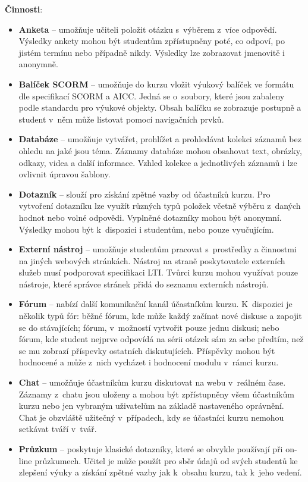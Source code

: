 \documentclass[
print,
  11pt,
  table,   
  nolof,    
  nolot,
  oneside,
  draft
]{fithesis3}
\begin{document}
\textbf{Činnosti}:
\begin{itemize}
\item \textbf{Anketa} -- umožňuje učiteli položit otázku s~výběrem z~více odpovědí. Výsledky ankety mohou být studentům zpřístupněny poté, co odpoví, po jistém termínu nebo případně nikdy. Výsledky lze zobrazovat jmenovitě i anonymně.
\item \textbf{Balíček SCORM} -- umožňuje do kurzu vložit výukový balíček ve formátu dle specifikací SCORM a AICC. Jedná se o~soubory, které jsou zabaleny podle standardu pro výukové objekty. Obsah balíčku se zobrazuje postupně a student v~něm může listovat pomocí navigačních prvků. 
\item \textbf{Databáze} -- umožňuje vytvářet, prohlížet a prohledávat kolekci záznamů bez ohledu na jaké jsou téma. Záznamy databáze mohou obsahovat text, obrázky, odkazy, videa a další informace. Vzhled kolekce a jednotlivých zázna\-mů i lze ovlivnit úpravou šablony.
\item \textbf{Dotazník} -- slouží pro získání zpětné vazby od účastníků kurzu. Pro vytvoření dotazníku lze využít různých typů položek včetně výběru z~daných hodnot nebo volné odpovědi. Vyplněné dotazníky mohou být anonymní. Výsledky mohou být k~dispozici i studentům, nebo pouze vyučujícím.
\item \textbf{Externí nástroj} -- umožňuje studentům pracovat s~prostředky a činnostmi na jiných webových stránkách. Nástroj na straně poskytovatele externích služeb musí podporovat specifikaci LTI. Tvůrci kurzu mohou využívat pouze nástroje, které správce stránek přidá do seznamu externích nástrojů.
\item \textbf{Fórum} -- nabízí další komunikační kanál účastníkům kurzu. K~dispozici je několik typů fór: běžné fórum, kde může každý začínat nové diskuse a zapojit se do stávajících; fórum, v~možností vytvořit pouze jednu diskusi; nebo fórum, kde student nejprve odpovídá na sérii otázek sám za sebe předtím, než se mu zobrazí příspevky ostatních diskutujících. Příspěvky mohou být hodnocené a může z~nich vycházet i hodnocení modulu v~rámci kurzu.
\item \textbf{Chat} -- umožňuje účastníkům kurzu diskutovat na webu v~reálném čase. Záznamy z~chatu jsou uloženy a mohou být zpřístupněny všem účastníkům kurzu nebo jen vybraným uživatelům na základě nastaveného oprávnění. Chat je obzvláště užitečný v~případech, kdy se účastníci kurzu nemohou setkávat tváří v~tvář.
\item \textbf{Průzkum} -- poskytuje klasické dotazníky, které se obvykle používají při on-line průzkumech. Učitel je může použít pro sběr údajů od svých studentů ke zlepšení výuky a získání zpětné vazby jak k~obsahu kurzu, tak k~jeho vedení.


\end{itemize}
\end{document}

